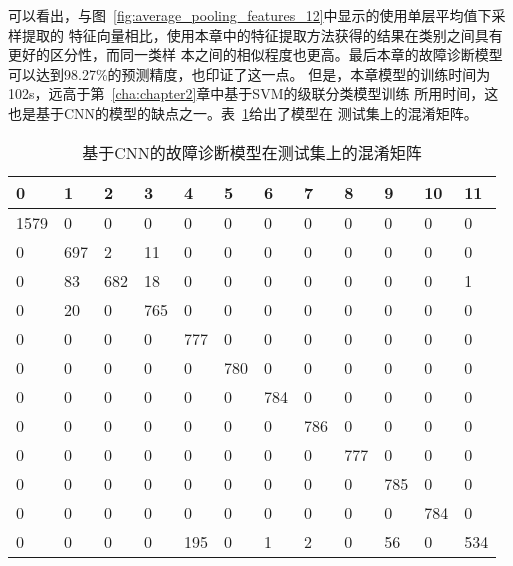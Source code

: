 可以看出，与图~\ref{fig:average_pooling_features_12}中显示的使用单层平均值下采样提取的
特征向量相比，使用本章中的特征提取方法获得的结果在类别之间具有更好的区分性，而同一类样
本之间的相似程度也更高。最后本章的故障诊断模型可以达到98.27\%的预测精度，也印证了这一点。
但是，本章模型的训练时间为102s，远高于第~\ref{cha:chapter2}章中基于SVM的级联分类模型训练
所用时间，这也是基于CNN的模型的缺点之一。表~\ref{tab:chap3:confusion_matrix}给出了模型在
测试集上的混淆矩阵。
\begin{table}[htb]
  \centering
  \begin{minipage}[t]{0.9\linewidth} %
  \caption{基于CNN的故障诊断模型在测试集上的混淆矩阵}
  \label{tab:chap3:confusion_matrix}
    \begin{tabularx}{\linewidth}{XXXXXXXXXXXX}
      \toprule[1.5pt]
         0 &   1 &   2 &   3 &   4 &   5 &   6 &   7 &   8 &   9 &  10 &  11 \\\midrule[1pt]
      1579 &   0 &   0 &   0 &   0 &   0 &   0 &   0 &   0 &   0 &   0 &   0 \\
         0 & 697 &   2 &  11 &   0 &   0 &   0 &   0 &   0 &   0 &   0 &   0 \\
         0 &  83 & 682 &  18 &   0 &   0 &   0 &   0 &   0 &   0 &   0 &   1 \\
         0 &  20 &   0 & 765 &   0 &   0 &   0 &   0 &   0 &   0 &   0 &   0 \\
         0 &   0 &   0 &   0 & 777 &   0 &   0 &   0 &   0 &   0 &   0 &   0 \\
         0 &   0 &   0 &   0 &   0 & 780 &   0 &   0 &   0 &   0 &   0 &   0 \\
         0 &   0 &   0 &   0 &   0 &   0 & 784 &   0 &   0 &   0 &   0 &   0 \\
         0 &   0 &   0 &   0 &   0 &   0 &   0 & 786 &   0 &   0 &   0 &   0 \\
         0 &   0 &   0 &   0 &   0 &   0 &   0 &   0 & 777 &   0 &   0 &   0 \\
         0 &   0 &   0 &   0 &   0 &   0 &   0 &   0 &   0 & 785 &   0 &   0 \\
         0 &   0 &   0 &   0 &   0 &   0 &   0 &   0 &   0 &   0 & 784 &   0 \\
         0 &   0 &   0 &   0 & 195 &   0 &   1 &   2 &   0 &  56 &   0 & 534 \\
      \bottomrule[1.5pt]
    \end{tabularx}
  \end{minipage}
\end{table}

